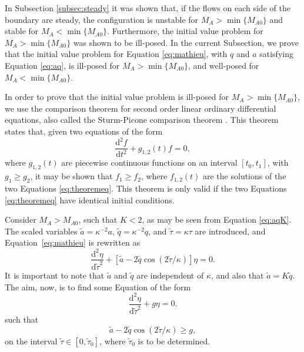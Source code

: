 In Subsection \ref{subsec:steady} it was shown that, if the flows on each side of the boundary are steady, the configuration is unstable for $M_A > \min\{M_{A0}\}$ and stable for $M_A < \min\{M_{A0}\}$.
Furthermore, the initial value problem for $M_A > \min\{M_{A0}\}$ was shown to be ill-posed.
In the current Subsection, we prove that the initial value problem for Equation \eqref{eq:mathieu}, with $q$ and $a$ satisfying Equation \eqref{eq:aq}, is ill-posed for $M_A > \min\{M_{A0}\}$, and well-posed for $M_A < \min\{M_{A0}\}$.

In order to prove that the initial value problem is ill-posed for $M_A > \min\{M_{A0}\}$, we use the comparison theorem for second order linear ordinary differential equations, also called the Sturm-Picone comparison theorem \citep[e.g.][]{Coddington1955}.
This theorem states that, given two equations of the form
%
\begin{equation}
\label{eq:theoremeq}
\frac{\mathrm{d}^2 f}{\mathrm{d} t^2} + g_{1, 2}(t) f = 0,
\end{equation}
%
where $g_{1,2}(t)$ are piecewise continuous functions on an interval $[t_0, t_1]$, with $g_1 \geq g_2$, it may be shown that $f_1 \geq f_2$, where $f_{1, 2}(t)$ are the solutions of the two Equations \eqref{eq:theoremeq}.
This theorem is only valid if the two Equations \eqref{eq:theoremeq} have identical initial conditions.

Consider $M_A > M_{A0}$, such that $K < 2$, as may be seen from Equation \eqref{eq:aqK}.
The scaled variables $\tilde{a} = \kappa^{-2} a$\/, $\tilde{q} = \kappa^{-2} q$, and $\tilde{\tau} = \kappa\tau$ are introduced, and Equation~\eqref{eq:mathieu} is rewritten as
%
\begin{equation}
\label{eq17}
\frac{\mathrm{d}^2 \eta}{\mathrm{d}\tilde{\tau}^2}
+ [\tilde{a} - 
2\tilde{q}\cos(2\tilde{\tau}/\kappa)] \eta = 0. 
\end{equation}
%
It is important to note that $\tilde{a}$ and $\tilde{q}$ are independent of $\kappa$, and also that $\tilde{a} = K\tilde{q}$.
The aim, now, is to find some Equation of the form 
%
\begin{equation}
\label{eq:eqncomparison}
\frac{\mathrm{d}^2 \eta}{\mathrm{d}\tilde{\tau}^2} + g \eta = 0. 
\end{equation}
%
such that
%
\begin{equation}
\label{eq:ivp1}
\tilde{a} - 2\tilde{q}\cos(2\tilde{\tau}/\kappa) \geq g,
\end{equation}
%
on the interval $\tilde{\tau} \in [0,\tilde{\tau}_0]$, where $\tilde{\tau}_0$ is to be determined.

